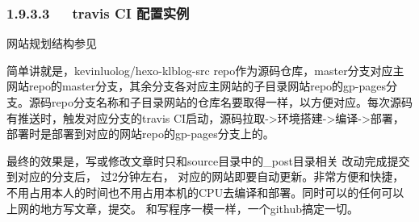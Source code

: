 \documentclass[letterpaper,12pt,english]{sphinxmanual}
\begin{document}
\begin{enumerate}
\begin{itemize}
\begin{enumerate}
\end{enumerate}

\begin{sphinxVerbatim}[commandchars=\\\{\}]
 
   
   
   
\end{sphinxVerbatim}

\end{itemize}

\end{enumerate}


\subsubsection{1.9.3.3   travis CI 配置实例}
\label{\detokenize{001software/001install/001._u7f51_u7ad9/hexo:id24}}
网站规划结构参见 {\hyperref[\detokenize{001software/001install/001._u7f51_u7ad9/hexo:my-deploy-kevinluolog-github-io}]{}}

简单讲就是，kevinluolog/hexo-klblog-src repo作为源码仓库，master分支对应主网站repo的master分支，其余分支各对应主网站的子目录网站repo的gp-pages分支。源码repo分支名称和子目录网站的仓库名要取得一样，以方便对应。每次源码有推送时，触发对应分支的travis CI启动，源码拉取-\textgreater{}环境搭建-\textgreater{}编译-\textgreater{}部署，部署时是部署到对应的网站repo的gp-pages分支上的。

最终的效果是，写或修改文章时只和source目录中的\_post目录相关  改动完成提交到对应的分支后， 过2分钟左右， 对应的网站即要自动更新。非常方便和快捷，不用占用本人的时间也不用占用本机的CPU去编译和部署。同时可以的任何可以上网的地方写文章，提交。 和写程序一模一样，一个github搞定一切。
\end{document}
